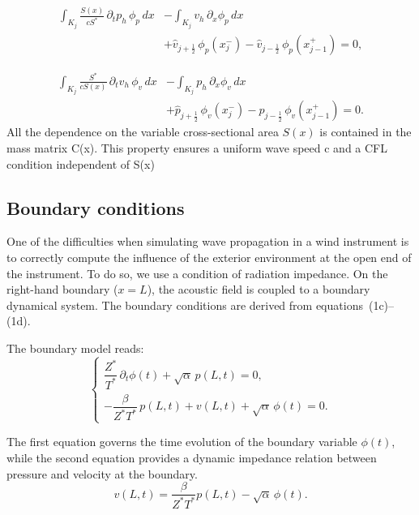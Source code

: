 \documentclass[11pt,a4paper]{report}
\theoremstyle{plain}
\theoremstyle{definition}
\begin{document}
\begin{equation}
\begin{aligned}
\int_{K_j} \frac{S(x)}{cS^\ast}\,
\partial_t p_h \, \phi_p \, dx
&-
\int_{K_j} v_h \, \partial_x \phi_p \, dx \\
&+
\widehat{v}_{j+\frac12}\, \phi_p(x_j^-)
-
\widehat{v}_{j-\frac12}\, \phi_p(x_{j-1}^+)
=0,
\end{aligned}
\label{eq:dg_wave_p}
\end{equation}

\begin{equation}
\begin{aligned}
\int_{K_j} \frac{S^\ast}{cS(x)}\,
\partial_t v_h \, \phi_v \, dx
&-
\int_{K_j} p_h \, \partial_x \phi_v \, dx \\
&+
\widehat{p}_{j+\frac12}\, \phi_v(x_j^-)
-
\widehat{p}_{j-\frac12}\, \phi_v(x_{j-1}^+)
=0.
\end{aligned}
\label{eq:dg_wave_v}
\end{equation}
All the dependence on the variable cross-sectional area $S(x)$ is contained in the mass matrix C(x). 
This property ensures a uniform wave speed c and a CFL condition independent of S(x)

\subsection{Boundary conditions}

One of the difficulties when simulating wave propagation in a wind instrument is to correctly
compute the influence of the exterior environment at the open end of the instrument. \cite{thibault}
To do so, we use a condition of radiation impedance. 
On the right-hand boundary ($x = L$), the acoustic field is coupled to a boundary dynamical system.
The boundary conditions are derived from equations~(1c)--(1d).

The boundary model reads:
\begin{equation}
\begin{cases}
\dfrac{Z^\ast}{T^\ast}\,\partial_t \phi(t)
+ \sqrt{\alpha}\, p(L,t) = 0,
\\[0.4em]
-\dfrac{\beta}{Z^\ast T^\ast}\, p(L,t)
+ v(L,t)
+ \sqrt{\alpha}\,\phi(t) = 0.
\end{cases}
\label{eq:bc_ode_pde}
\end{equation}

The first equation governs the time evolution of the boundary variable $\phi(t)$, while the second
equation provides a dynamic impedance relation between pressure and velocity at the boundary.
\begin{equation}
v(L,t) = \frac{\beta}{Z^\ast T^\ast} p(L,t) - \sqrt{\alpha}\,\phi(t).
\tag{BC}
\end{equation}
\end{document}
